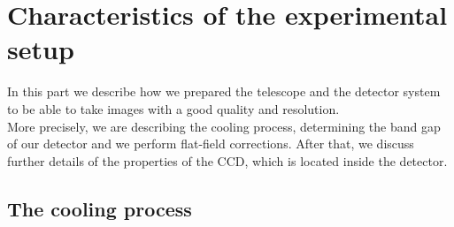 \chapter{Characteristics of the experimental setup}
In this part we describe how we prepared the telescope and the detector system to be able to take images with a good quality and resolution. \\
More precisely, we are describing the cooling process, determining the band gap of our detector and we perform flat-field corrections. After that, we discuss further details of the properties of the CCD, which is located inside the detector. 

\section{The cooling process}

